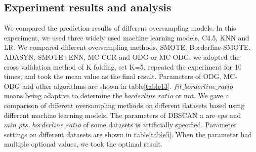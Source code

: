 \documentclass[runningheads]{llncs}
\begin{document}
\subsection{Experiment results and analysis}
We compared the prediction results of different oversampling models.
In this experiment, we used three widely used machine learning models, C4.5, KNN and LR.
We compared different oversampling methods, SMOTE, Borderline-SMOTE, ADASYN, SMOTE+ENN, MC-CCR 
and ODG or MC-ODG.
we adopted the cross validation method of K folding, 
set K=5, repeated the experiment for 10 times, 
and took the mean value as the final result.
Parameters of ODG, MC-ODG and other algorithms are shown in table\ref{table13}.
$fit\_borderline\_ratio$ means being 
adaptive to determine the $borderline\_ratio$ or not.
We gave a comparison of different oversampling methods on different 
datasets based using different machine learning models.  
The parameters of DBSCAN n are $eps$ and $min\_pts$.
$borderline\_ratio$ of some datasets is artificially specified.
Parameter settings on different datasets are shown in table\ref{table5}.
When the parameter had multiple optional values, we took the optimal result.
\end{document}
